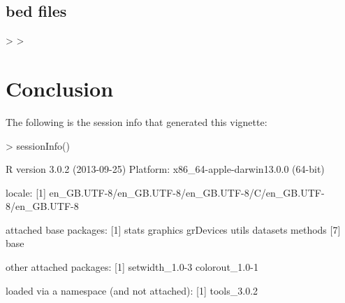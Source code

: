 \documentclass{article}
\begin{document}
\subsection{bed files}

\begin{Schunk}
\begin{Sinput}
> 
> 
\end{Sinput}
\end{Schunk}


\section{Conclusion}
The following is the session info that generated this vignette:
\begin{Schunk}
\begin{Sinput}
>   sessionInfo()
\end{Sinput}
\begin{Soutput}
R version 3.0.2 (2013-09-25)
Platform: x86_64-apple-darwin13.0.0 (64-bit)

locale:
[1] en_GB.UTF-8/en_GB.UTF-8/en_GB.UTF-8/C/en_GB.UTF-8/en_GB.UTF-8

attached base packages:
[1] stats     graphics  grDevices utils     datasets  methods  
[7] base     

other attached packages:
[1] setwidth_1.0-3 colorout_1.0-1

loaded via a namespace (and not attached):
[1] tools_3.0.2
\end{Soutput}
\end{Schunk}

\newpage


\end{document}
